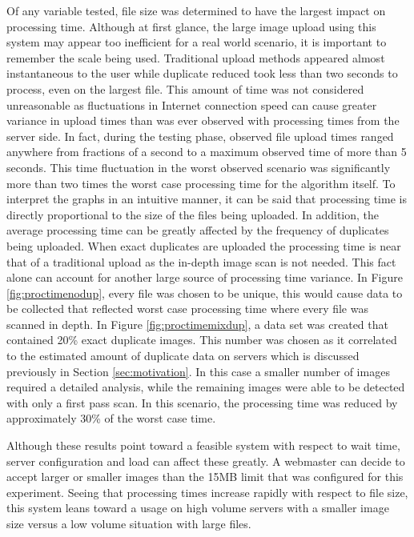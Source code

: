 Of any variable tested, file size was determined to have the largest impact on processing time. Although at first glance, the large image upload using this system may appear too inefficient for a real world scenario, it is important to remember the scale being used. Traditional upload methods appeared almost instantaneous to the user while duplicate reduced took less than two seconds to process, even on the largest file. This amount of time was not considered unreasonable as fluctuations in Internet connection speed can cause greater variance in upload times than was ever observed with processing times from the server side. In fact, during the testing phase, observed file upload times ranged anywhere from fractions of a second to a maximum observed time of more than 5 seconds. This time fluctuation in the worst observed scenario was significantly more than two times the worst case processing time for the algorithm itself. To interpret the graphs in an intuitive manner, it can be said that processing time is directly proportional to the size of the files being uploaded. In addition, the average processing time can be greatly affected by the frequency of duplicates being uploaded. When exact duplicates are uploaded the processing time is near that of a traditional upload as the in-depth image scan is not needed. This fact alone can account for another large source of processing time variance. In Figure \ref{fig:proctimenodup}, every file was chosen to be unique, this would cause data to be collected that reflected worst case processing time where every file was scanned in depth. In Figure \ref{fig:proctimemixdup}, a data set was created that contained 20\% exact duplicate images. This number was chosen as it correlated to the estimated amount of duplicate data on servers which is discussed previously in Section \ref{sec:motivation}. In this case a smaller number of images required a detailed analysis, while the remaining images were able to be detected with only a first pass scan. In this scenario, the processing time was reduced by approximately 30\% of the worst case time.

Although these results point toward a feasible system with respect to wait time, server configuration and load can affect these greatly. A webmaster can decide to accept larger or smaller images than the 15MB limit that was configured for this experiment. Seeing that processing times increase rapidly with respect to file size, this system leans toward a usage on high volume servers with a smaller image size versus a low volume situation with large files.

